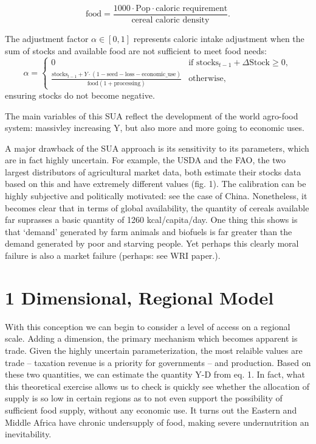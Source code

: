 \documentclass[11pt]{article}
\begin{document}
\begin{equation}\label{eq:food}
\text{food} = \frac{1000 \cdot \text{Pop} \cdot \text{caloric requirement}}{\text{cereal caloric density}}.
\end{equation}

The adjustment factor $\alpha\in[0,1]$ represents caloric intake adjustment when the sum of stocks and available food are not sufficient to meet food needs: 
\begin{equation}
\alpha = 
\begin{cases} 
0 & \text{if } \text{stocks}_{t-1} + \Delta\text{Stock} \geq 0, \\ 
\frac{\text{stocks}_{t-1} + Y \cdot (1 - \text{seed} - \text{loss} -  \text{economic\_use})}{\text{food}(1 + \text{processing})} & \text{otherwise,}
\end{cases}
\end{equation}
ensuring stocks do not become negative.

The main variables of this SUA reflect the development of the world agro-food system: massivley increasing Y, but also more and more going to economic uses.

A major drawback of the SUA approach is its sensitivity to its parameters, which are in fact highly uncertain. For example, the USDA and the FAO, the two largest distributors of agricultural market data, both estimate their stocks data based on this and have extremely different values (fig. 1). The calibration can be highly subjective and politically motivated: see the case of China. Nonetheless, it becomes clear that in terms of global availability, the quantity of cereals available far suprasses a basic quantity of 1260 kcal/capita/day. One thing this shows is that `demand' generated by farm animals and biofuels is far greater than the demand generated by poor and starving people. Yet perhaps this clearly moral failure is also a market failure (perhaps: see WRI paper.).
  
 \section{1 Dimensional, Regional Model}
With this conception we can begin to consider a level of access on a regional scale. Adding a dimension, the primary mechanism which becomes apparent is trade. Given the highly uncertain parameterization, the most relaible values are trade -- taxation revenue is a priority for governments -- and production. Based on these two quantities, we can estimate the quantity Y-D from eq. 1. In fact, what this theoretical exercise allows us to check is quickly see whether the allocation of supply is so low in certain regions as to not even support the possibility of sufficient food supply, without any economic use. It turns out the Eastern and Middle Africa have chronic undersupply of food, making severe undernutrition an inevitability.
\end{document}
